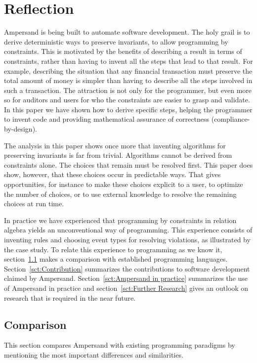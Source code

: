 \documentclass{elsarticle}
\begin{document}
\section{Reflection}
\label{sct:Reflection}
	Ampersand is being built to automate software development.
	The holy grail is to derive deterministic ways to preserve invariants, to allow programming by constraints.
	This is motivated by the benefits of describing a result in terms of constraints,
	rather than having to invent all the steps that lead to that result.
	For example, describing the situation that any financial transaction must preserve the total amount of money is simpler
	than having to describe all the steps involved in such a transaction.
	The attraction is not only for the programmer, but even more so for auditors and users for who the constraints are easier to grasp and validate.
	In this paper we have shown how to derive specific steps,
	helping the programmer to invent code and providing mathematical assurance of correctness (compliance-by-design).

	The analysis in this paper shows once more that inventing algorithms for preserving invariants is far from trivial.
	Algorithms cannot be derived from constraints alone. The choices that remain must be resolved first.
	This paper does show, however, that these choices occur in predictable ways.
	That gives opportunities, for instance to make these choices explicit to a user, to optimize the number of choices,
	or to use external knowledge to resolve the remaining choices at run time.

	In practice we have experienced that programming by constraints in relation algebra yields an unconventional way of programming.
	This experience consists of inventing rules and choosing event types for resolving violations, as illustrated by the case study.
	To relate this experience to programming as we know it, section~\ref{sct:Comparison} makes a comparison with established programming languages.
	Section~\ref{sct:Contribution} summarizes the contributions to software development claimed by Ampersand.
	Section~\ref{sct:Ampersand in practice} summarizes the use of Ampersand in practice and
	section~\ref{sct:Further Research} gives an outlook on research that is required in the near future.

\subsection{Comparison}
\label{sct:Comparison}
	This section compares Ampersand with existing programming paradigms by mentioning the most important differences and similarities.
\end{document}
